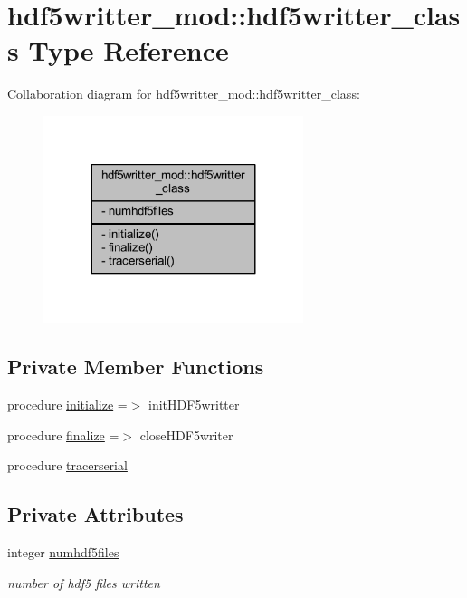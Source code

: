\hypertarget{structhdf5writter__mod_1_1hdf5writter__class}{}\section{hdf5writter\+\_\+mod\+:\+:hdf5writter\+\_\+class Type Reference}
\label{structhdf5writter__mod_1_1hdf5writter__class}


Collaboration diagram for hdf5writter\+\_\+mod\+:\+:hdf5writter\+\_\+class\+:\nopagebreak
\begin{figure}[H]
\begin{center}
\leavevmode
\includegraphics[width=215pt]{structhdf5writter__mod_1_1hdf5writter__class__coll__graph}
\end{center}
\end{figure}
\subsection*{Private Member Functions}
\begin{DoxyCompactItemize}
\item 
procedure \mbox{\hyperlink{structhdf5writter__mod_1_1hdf5writter__class_aa437336b86b7b5f7b9369f6f27c0f66a}{initialize}} =$>$ init\+H\+D\+F5writter
\item 
procedure \mbox{\hyperlink{structhdf5writter__mod_1_1hdf5writter__class_ad2b9dc41e38680829d53104ba83d98f9}{finalize}} =$>$ close\+H\+D\+F5writer
\item 
procedure \mbox{\hyperlink{structhdf5writter__mod_1_1hdf5writter__class_ab3c7926065ca07074c5c8f1c809a66d3}{tracerserial}}
\end{DoxyCompactItemize}
\subsection*{Private Attributes}
\begin{DoxyCompactItemize}
\item 
integer \mbox{\hyperlink{structhdf5writter__mod_1_1hdf5writter__class_a8a8b6d09bca45a7e9014638381c76d80}{numhdf5files}}
\begin{DoxyCompactList}\small\item\em number of hdf5 files written \end{DoxyCompactList}\end{DoxyCompactItemize}



